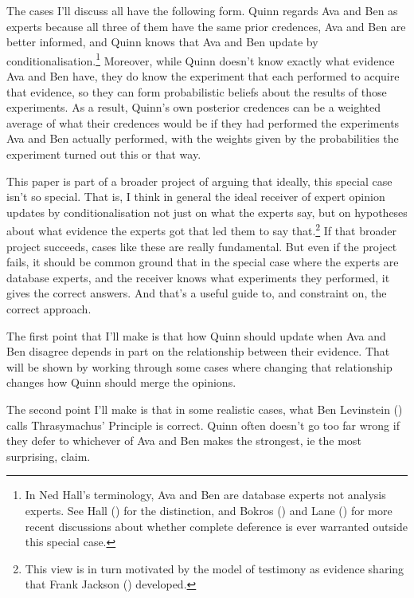 \documentclass[
  11pt,
  letterpaper,
  DIV=11,
  numbers=noendperiod,
  twoside]{scrartcl}
\begin{document}
The cases I'll discuss all have the following form. Quinn regards Ava
and Ben as experts because all three of them have the same prior
credences, Ava and Ben are better informed, and Quinn knows that Ava and
Ben update by conditionalisation.\footnote{In Ned Hall's terminology,
  Ava and Ben are database experts not analysis experts. See Hall
  () for the distinction, and Bokros
  () and Lane
  () for more recent discussions about
  whether complete deference is ever warranted outside this special
  case.} Moreover, while Quinn doesn't know exactly what evidence Ava
and Ben have, they do know the experiment that each performed to acquire
that evidence, so they can form probabilistic beliefs about the results
of those experiments. As a result, Quinn's own posterior credences can
be a weighted average of what their credences would be if they had
performed the experiments Ava and Ben actually performed, with the
weights given by the probabilities the experiment turned out this or
that way.

This paper is part of a broader project of arguing that ideally, this
special case isn't so special. That is, I think in general the ideal
receiver of expert opinion updates by conditionalisation not just on
what the experts say, but on hypotheses about what evidence the experts
got that led them to say that.\footnote{This view is in turn motivated
  by the model of testimony as evidence sharing that Frank Jackson
  () developed.} If that broader project
succeeds, cases like these are really fundamental. But even if the
project fails, it should be common ground that in the special case where
the experts are database experts, and the receiver knows what
experiments they performed, it gives the correct answers. And that's a
useful guide to, and constraint on, the correct approach.

The first point that I'll make is that how Quinn should update when Ava
and Ben disagree depends in part on the relationship between their
evidence. That will be shown by working through some cases where
changing that relationship changes how Quinn should merge the opinions.

The second point I'll make is that in some realistic cases, what Ben
Levinstein () calls Thrasymachus'
Principle is correct. Quinn often doesn't go too far wrong if they defer
to whichever of Ava and Ben makes the strongest, ie the most surprising,
claim.
\end{document}
